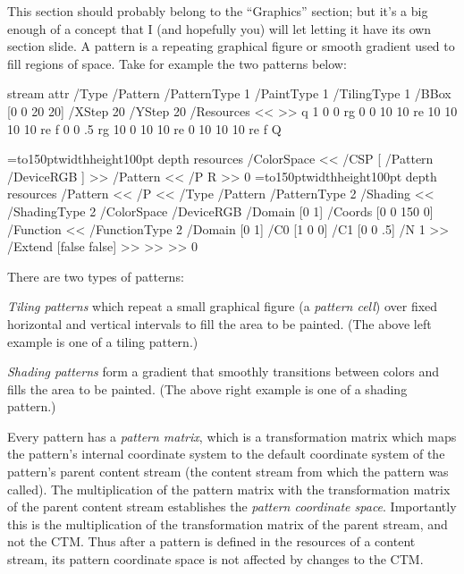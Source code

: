 This section should probably belong to the ``Graphics'' section; but it's a big enough of a concept that I
(and hopefully you) will let letting it have its own section slide.
A pattern is a repeating graphical figure or smooth gradient used to fill regions of space.
Take for example the two patterns below:

\immediate\pdfobj stream attr{
    /Type /Pattern
    /PatternType 1
    /PaintType 1
    /TilingType 1
    /BBox [0 0 20 20] 
    /XStep 20
    /YStep 20
    /Resources << >>
}{
    q
    1 0 0 rg 0 0 10 10 re 10 10 10 10 re f
    0 0 .5 rg 10 0 10 10 re 0 10 10 10 re f
    Q
}

\bigskip
\bgroup{}=\hbox to150pt{\vrule width\z@ height100pt depth\z@%
\hfil}
\pdfxform resources{%
    /ColorSpace << /CSP [ /Pattern /DeviceRGB ] >>
    /Pattern << /P \the\pdflastobj{} R >>
}0
\edef\A{\the\pdflastxform}
=\hbox to150pt{\vrule width\z@ height100pt depth\z@%
\hfil}%
\pdfxform resources{%
    /Pattern << /P <<
        /Type /Pattern
        /PatternType 2
        /Shading <<
            /ShadingType 2 /ColorSpace /DeviceRGB /Domain [0 1] /Coords [0 0 150 0]
            /Function << /FunctionType 2 /Domain [0 1] /C0 [1 0 0] /C1 [0 0 .5] /N 1 >>
            /Extend [false false]
        >>
    >> >>
}0
\centerline{\pdfrefxform\A\hfil\pdfrefxform\pdflastxform}\egroup
\bigskip

There are two types of patterns:
\benum
    \item {\it Tiling patterns} which repeat a small graphical figure (a {\it pattern cell}) over fixed
    horizontal and vertical intervals to fill the area to be painted.
    (The above left example is one of a tiling pattern.)
    \item {\it Shading patterns} form a gradient that smoothly transitions between colors and fills the area
    to be painted.
    (The above right example is one of a shading pattern.)
\eenum

Every pattern has a {\it pattern matrix}, which is a transformation matrix which maps the pattern's internal
coordinate system to the default coordinate system of the pattern's parent content stream (the content stream
from which the pattern was called).
The multiplication of the pattern matrix with the transformation matrix of the parent content stream
establishes the {\it pattern coordinate space}.
Importantly this is the multiplication of the transformation matrix of the parent stream, and not the CTM.
Thus after a pattern is defined in the resources of a content stream, its pattern coordinate space is not
affected by changes to the CTM.

